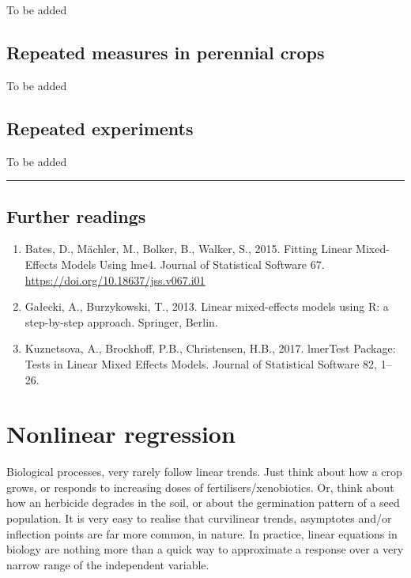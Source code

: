 \documentclass[a4paper,12pt,oneside]{book}
\providecommand{\tightlist}{%
  \setlength{\itemsep}{0pt}\setlength{\parskip}{0pt}}
\begin{document}
To be added

\hypertarget{repeated-measures-in-perennial-crops}{%
\section{Repeated measures in perennial crops}\label{repeated-measures-in-perennial-crops}}

To be added

\hypertarget{repeated-experiments}{%
\section{Repeated experiments}\label{repeated-experiments}}

To be added

\begin{center}\rule{0.5\linewidth}{0.5pt}\end{center}

\hypertarget{further-readings-10}{%
\section{Further readings}\label{further-readings-10}}

\begin{enumerate}
\def\labelenumi{\arabic{enumi}.}
\tightlist
\item
  Bates, D., Mächler, M., Bolker, B., Walker, S., 2015. Fitting Linear Mixed-Effects Models Using lme4. Journal of Statistical Software 67. \url{https://doi.org/10.18637/jss.v067.i01}
\item
  Gałecki, A., Burzykowski, T., 2013. Linear mixed-effects models using R: a step-by-step approach. Springer, Berlin.
\item
  Kuznetsova, A., Brockhoff, P.B., Christensen, H.B., 2017. lmerTest Package: Tests in Linear Mixed Effects Models. Journal of Statistical Software 82, 1--26.
\end{enumerate}

\hypertarget{nonlinear-regression}{%
\chapter{Nonlinear regression}\label{nonlinear-regression}}

Biological processes, very rarely follow linear trends. Just think about how a crop grows, or responds to increasing doses of fertilisers/xenobiotics. Or, think about how an herbicide degrades in the soil, or about the germination pattern of a seed population. It is very easy to realise that curvilinear trends, asymptotes and/or inflection points are far more common, in nature. In practice, linear equations in biology are nothing more than a quick way to approximate a response over a very narrow range of the independent variable.
\end{document}
